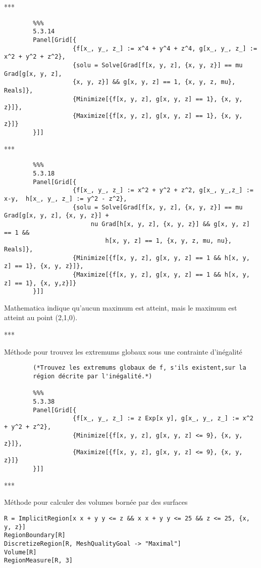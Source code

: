 	\begin{center}***\end{center}
	
	\begin{verbatim}
		%%%
		5.3.14
		Panel[Grid[{
		           {f[x_, y_, z_] := x^4 + y^4 + z^4, g[x_, y_, z_] := x^2 + y^2 + z^2},
		           {solu = Solve[Grad[f[x, y, z], {x, y, z}] == mu Grad[g[x, y, z], 
		           {x, y, z}] && g[x, y, z] == 1, {x, y, z, mu}, Reals]},
		           {Minimize[{f[x, y, z], g[x, y, z] == 1}, {x, y, z}]},
		           {Maximize[{f[x, y, z], g[x, y, z] == 1}, {x, y, z}]}
		}]]
	\end{verbatim}
	
	\begin{center}***\end{center}
	
	\begin{verbatim}
		%%%
		5.3.18
		Panel[Grid[{
		           {f[x_, y_, z_] := x^2 + y^2 + z^2, g[x_, y_,z_] := x-y,	h[x_, y_, z_] := y^2 - z^2},
		           {solu = Solve[Grad[f[x, y, z], {x, y, z}] == mu Grad[g[x, y, z], {x, y, z}] + 
		                nu Grad[h[x, y, z], {x, y, z}] && g[x, y, z] == 1 && 
		                    h[x, y, z] == 1, {x, y, z, mu, nu}, Reals]},
		           {Minimize[{f[x, y, z], g[x, y, z] == 1 && h[x, y, z] == 1}, {x, y, z}]},
		           {Maximize[{f[x, y, z], g[x, y, z] == 1 && h[x, y, z] == 1}, {x, y,z}]}
		}]]
	\end{verbatim}
	Mathematica indique qu'aucun maximum est atteint, mais le maximum est atteint au point (2,1,0).
	
	\begin{center}***\end{center}
	
	\begin{center}
		Méthode pour trouvez les extremums globaux sous une contrainte d'inégalité
	\end{center}
	\begin{verbatim}
		(*Trouvez les extremums globaux de f, s'ils existent,sur la
		région décrite par l'inégalité.*)
		
		%%%
		5.3.38
		Panel[Grid[{
		           {f[x_, y_, z_] := z Exp[x y], g[x_, y_, z_] := x^2 + y^2 + z^2},
		           {Minimize[{f[x, y, z], g[x, y, z] <= 9}, {x, y, z}]},
		           {Maximize[{f[x, y, z], g[x, y, z] <= 9}, {x, y, z}]}
		}]]
	\end{verbatim}
	
	\begin{center}***\end{center}
	
	\begin{center}
		Méthode pour calculer des volumes bornée par des surfaces 
	\end{center}
		\begin{flushleft}
			\verb|R = ImplicitRegion[x x + y y <= z && x x + y y <= 25 && z <= 25, {x, y, z}]|\\
			\verb|RegionBoundary[R]|\\
			\verb|DiscretizeRegion[R, MeshQualityGoal -> "Maximal"]|\\
			\verb|Volume[R]|\\
			\verb|RegionMeasure[R, 3]|
		\end{flushleft}	